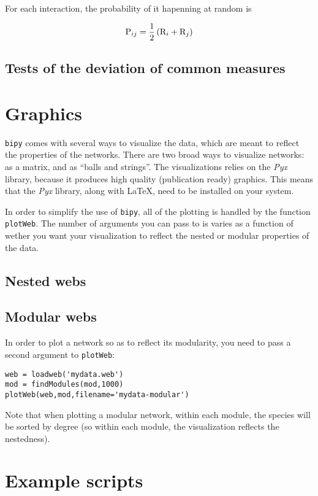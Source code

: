 \documentclass[10pt]{scrbook}
\begin{document}
For each interaction, the probability of it hapenning at random is

\begin{equation}
	\mathrm{P}\sb{ij} = \frac{1}{2}\left(\mathrm{R}\sb{i}+\mathrm{R}\sb{j}\right)
\end{equation}


\section{Tests of the deviation of common measures}

\chapter{Graphics}

\texttt{bipy} comes with several ways to visualize the data, which are meant to reflect the properties of the networks. There are two broad ways to visualize networks: as a matrix, and as ``balls and strings''. The visualizations relies on the \emph{Pyx} library, because it produces high quality (publication ready) graphics. This means that the \emph{Pyx} library, along with \LaTeX, need to be installed on your system.

In order to simplify the use of \texttt{bipy}, all of the plotting is handled by the function \texttt{plotWeb}. The number of arguments you can pass to is varies as a function of wether you want your visualization to reflect the nested or modular properties of the data.

\section{Nested webs}



\section{Modular webs}

In order to plot a network so as to reflect its modularity, you need to pass a second argument to \texttt{plotWeb}:

\begin{lstlisting}[caption=plotting a modular network]
web = loadweb('mydata.web')
mod = findModules(mod,1000)
plotWeb(web,mod,filename='mydata-modular')
\end{lstlisting}

Note that when plotting a modular network, within each module, the species will be sorted by degree (so within each module, the visualization reflects the nestedness).

\chapter{Example scripts\label{c:ex}}

%
%
\end{document}
